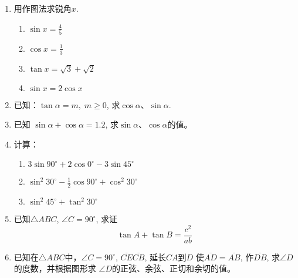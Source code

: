 \begin{enumerate}
    \item 用作图法求锐角$x$.
\begin{multicols}{2}
    \begin{enumerate}
        \item $\sin x=\frac{4}{5}$
        \item $\cos x=\frac{1}{3}$
        \item $\tan x=\sqrt{3}+\sqrt{2}$
        \item $\sin x=2\cos x$
    \end{enumerate}
\end{multicols}

\item 已知：$\tan\alpha=m,\; m\ge 0$, 求$\cos\alpha$、$\sin\alpha$.
\item 已知
   $ \sin\alpha+\cos\alpha=1.2$, 求$\sin\alpha$、$\cos\alpha$的值。
    \item 计算：
\begin{enumerate}
    \item $3\sin90^{\circ}+2\cos0^{\circ}-3\sin45^{\circ}$
    \item $\sin^2 30^{\circ}-\frac{1}{2}\cos 90^{\circ}+\cos^2 30^{\circ}$
    \item $\sin^2 45^{\circ}+\tan^2 30^{\circ}$
\end{enumerate}

    \item 已知$\triangle ABC$, $\angle C=90^{\circ}$, 求证
  \[  \tan A+\tan B=\frac{c^2}{ab}\]
    \item 已知在$\triangle ABC$中，$\angle C=90^{\circ}$, $\overline{CE}\overline{CB}$, 延长$CA$到$D$
    使$\overline{AD}=\overline{AB}$, 作$\overline{DB}$, 求$\angle D$的度数，并根据图形求
    $\angle D$的正弦、余弦、正切和余切的值。


\end{enumerate}
